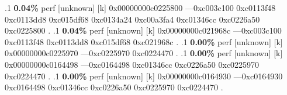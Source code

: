 \begin{profile}
{.1 \textbf{ 0.04\%} perf             [unknown]              [k] 0x00000000c0225800\newline {} ---0xc003c100\newline {} 0xc0113f48\newline {} 0xc0113dd8\newline {} 0xc015df68\newline {} 0xc0134a24\newline {} 0xc00a3fa4\newline {} 0xc01346cc\newline {} 0xc0226a50\newline {} 0xc0225800\newline {} . 
.1 \textbf{ 0.04\%} perf             [unknown]              [k] 0x00000000c021968c\newline {} ---0xc003c100\newline {} 0xc0113f48\newline {} 0xc0113dd8\newline {} 0xc015df68\newline {} 0xc021968c\newline {} . 
.1 \textbf{ 0.00\%} perf             [unknown]              [k] 0x00000000c0225970\newline {} ---0xc0225970\newline {} 0xc0224470\newline {} . 
.1 \textbf{ 0.00\%} perf             [unknown]              [k] 0x00000000c0164498\newline {} ---0xc0164498\newline {} 0xc01346cc\newline {} 0xc0226a50\newline {} 0xc0225970\newline {} 0xc0224470\newline {} . 
.1 \textbf{ 0.00\%} perf             [unknown]              [k] 0x00000000c0164930\newline {} ---0xc0164930\newline {} 0xc0164498\newline {} 0xc01346cc\newline {} 0xc0226a50\newline {} 0xc0225970\newline {} 0xc0224470\newline {} . 
}
\end{profile}
